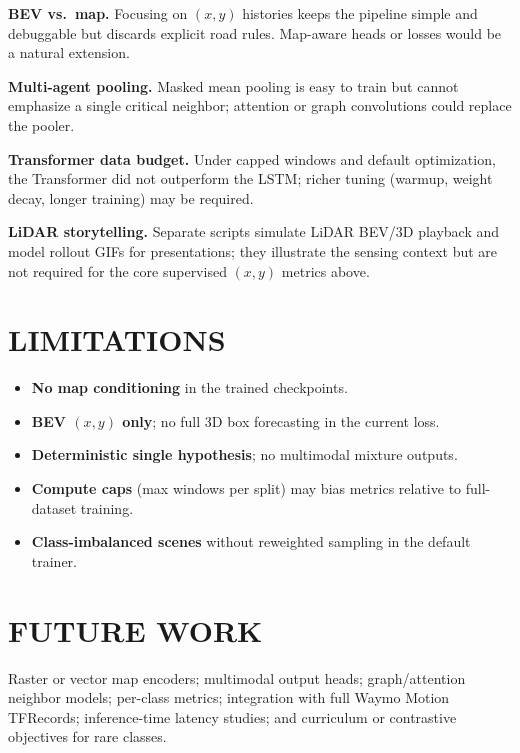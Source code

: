 \documentclass[letterpaper, 10 pt, conference]{ieeeconf}
\begin{document}
\textbf{BEV vs.\ map.} Focusing on $(x,y)$ histories keeps the pipeline simple and debuggable but discards explicit road rules. Map-aware heads or losses would be a natural extension.

\textbf{Multi-agent pooling.} Masked mean pooling is easy to train but cannot emphasize a single critical neighbor; attention or graph convolutions could replace the pooler.

\textbf{Transformer data budget.} Under capped windows and default optimization, the Transformer did not outperform the LSTM; richer tuning (warmup, weight decay, longer training) may be required.

\textbf{LiDAR storytelling.} Separate scripts simulate LiDAR BEV/3D playback and model rollout GIFs for presentations; they illustrate the sensing context but are not required for the core supervised $(x,y)$ metrics above.

\section{LIMITATIONS}

\begin{itemize}
    \item \textbf{No map conditioning} in the trained checkpoints.
    \item \textbf{BEV $(x,y)$ only}; no full 3D box forecasting in the current loss.
    \item \textbf{Deterministic single hypothesis}; no multimodal mixture outputs.
    \item \textbf{Compute caps} (max windows per split) may bias metrics relative to full-dataset training.
    \item \textbf{Class-imbalanced scenes} without reweighted sampling in the default trainer.
\end{itemize}

\section{FUTURE WORK}

Raster or vector map encoders; multimodal output heads; graph/attention neighbor models; per-class metrics; integration with full Waymo Motion TFRecords; inference-time latency studies; and curriculum or contrastive objectives for rare classes.
\end{document}
